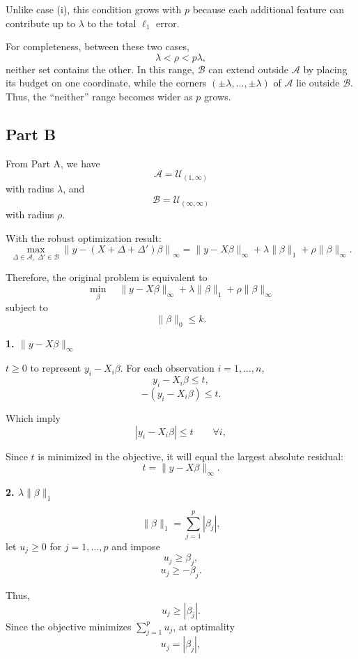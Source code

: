 \documentclass{article}
\begin{document}
Unlike case (i), this condition grows with $p$ because each additional
feature can contribute up to $\lambda$ to the total $\ell_1$ error.


\vspace{5mm}

For completeness, between these two cases,
\[
\boxed{
\lambda<\rho<p\lambda,
}
\]
neither set contains the other. In this range, $\mathcal B$ can extend
outside $\mathcal A$ by placing its budget on one coordinate, while the
corners $(\pm\lambda,\ldots,\pm\lambda)$ of $\mathcal A$ lie outside
$\mathcal B$. Thus, the ``neither'' range becomes wider as $p$ grows.



\newpage

\subsection*{Part B}


From Part A, we have
\[
\mathcal A=\mathcal U_{(1,\infty)}
\]
with radius $\lambda$, and
\[
\mathcal B=\mathcal U_{(\infty,\infty)}
\]
with radius $\rho$.

With the robust optimization result: 
\[
\max_{\Delta\in\mathcal A,\;\Delta'\in\mathcal B}
\left\|
y-(X+\Delta+\Delta')\beta
\right\|_\infty
=
\|y-X\beta\|_\infty
+
\lambda\|\beta\|_1
+
\rho\|\beta\|_\infty.
\]

Therefore, the original problem is equivalent to
\[
\min_\beta
\quad
\|y-X\beta\|_\infty
+
\lambda\|\beta\|_1
+
\rho\|\beta\|_\infty
\]
subject to
\[
\|\beta\|_0\leq k.
\]



\medskip
\textbf{1. $\|y-X\beta\|_\infty$}

$t\geq 0$ to represent $y_i-X_i\beta$. For each observation $i=1,\ldots,n$, 
\[
y_i-X_i\beta\leq t,
\]
\[
-(y_i-X_i\beta)\leq t.
\]

Which imply 
\[
|y_i-X_i\beta|\leq t
\qquad \forall i,
\]

Since $t$ is minimized in the objective, it will equal the largest
absolute residual:
\[
t=\|y-X\beta\|_\infty.
\]

\medskip
\textbf{2. $\lambda\|\beta\|_1$}


\[
\|\beta\|_1
=
\sum_{j=1}^p|\beta_j|,
\]
let $u_j\geq 0$ for $j=1,\ldots,p$ and impose
\[
u_j\geq\beta_j,
\]
\[
u_j\geq-\beta_j.
\]

Thus,
\[
u_j\geq|\beta_j|.
\]
Since the objective minimizes $\sum_{j=1}^p u_j$, at optimality
\[
u_j=|\beta_j|,
\]
\end{document}
